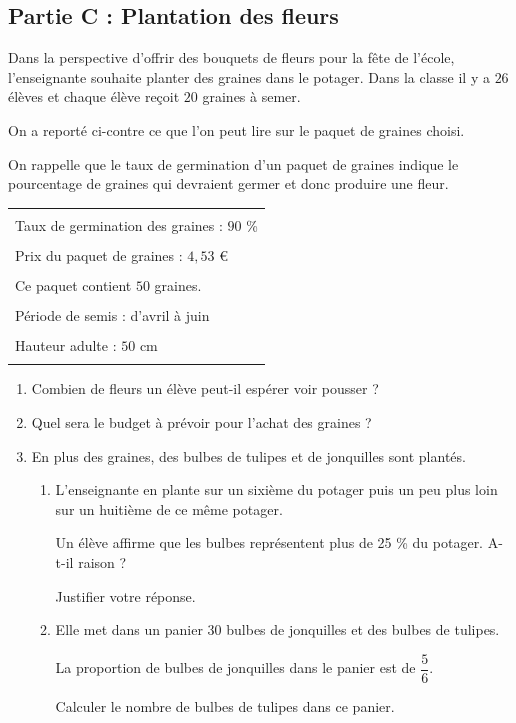 \subsection*{Partie C : Plantation des fleurs}
Dans la perspective d'offrir des bouquets de fleurs pour la fête de l'école, l'enseignante
souhaite planter des graines dans le potager. Dans la classe il y a $26$ élèves et chaque élève
re\c coit $20$ graines à semer.

\medskip
\begin{minipage}{7cm}
    On a reporté ci-contre ce que l’on peut lire sur le paquet de graines choisi.

    \medskip
    On rappelle que le taux de germination d'un paquet de graines indique le pourcentage de graines qui devraient
    germer et donc produire une fleur.
\end{minipage}
\hspace{1cm}
\begin{minipage}{9cm}
    \noindent\begin{tabularx}{0.9\linewidth}{|X|}
        \hline
        \\        
        Taux de germination des graines : $90$ \%\\ 
        \\       
        Prix du paquet de graines : $4,53$ \euro \\
        \\
        Ce paquet contient $50$ graines.\\
        \\
        Période de semis : d'avril à juin\\
        \\
        Hauteur adulte : $50$ cm\\
        \\
        \hline         
    \end{tabularx}
\end{minipage}

\begin{enumerate}
    \item Combien de fleurs un élève peut-il espérer voir pousser ?
    \item Quel sera le budget à prévoir pour l'achat des graines ?
    \item En plus des graines, des bulbes de tulipes et de jonquilles sont plantés.
    \begin{enumerate}
        \item L'enseignante en plante sur un sixième du potager puis un peu plus loin sur un huitième de ce même potager.
        
        Un élève affirme que les bulbes représentent plus de 25 \% du potager. A-t-il raison ?
        
        Justifier votre réponse.
        \item Elle met dans un panier $30$ bulbes de jonquilles et des bulbes de tulipes.
        
        La proportion de bulbes de jonquilles dans le panier est de $\dfrac{5}{6}$.

        Calculer le nombre de bulbes de tulipes dans ce panier.
    \end{enumerate}
\end{enumerate}
